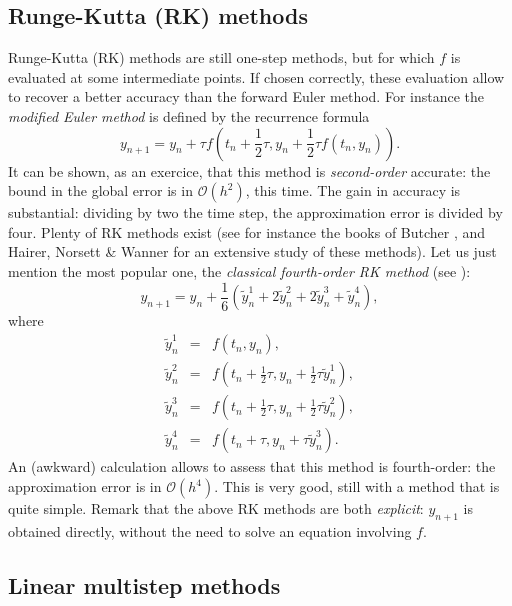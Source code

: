\documentclass{article}
\begin{document}
\subsection{Runge-Kutta (RK) methods}

Runge-Kutta (RK) methods are still one-step methods, but for which $f$ is evaluated at some intermediate points. If chosen correctly, these evaluation allow to recover a better accuracy than the forward Euler method. For instance the \emph{modified Euler method} is defined by the recurrence formula
\[
y_{n+1} = y_n + \tau f \left ( t_n + \frac12 \tau , y_n + \frac12 \tau f ( t_n , y_n ) \right ).
\]
It can be shown, as an exercice, that this method is \emph{second-order} accurate: the bound in the global error is in $\mathcal{O}(h^2)$, this time. The gain in accuracy is substantial: dividing by two the time step, the approximation error is divided by four.
Plenty of RK methods exist (see for instance the books of Butcher \cite{butcher16}, and Hairer, Norsett \& Wanner \cite{hairer93,hairer96} for an extensive study of these methods). Let us just mention the most popular one, the \emph{classical fourth-order RK method} (see \cite{suli03}):
\[
y_{n+1} = y_n + \frac16 \left ( \tilde y^1_n + 2 \tilde y^2_n + 2 \tilde y^3_n + \tilde y^4_n \right ),
\]
where
\begin{eqnarray*}
\tilde y^1_n &=& f(t_n,y_n), \\ 
\tilde y^2_n &=& f(t_n + \frac12 \tau, y_n + \frac12 \tau \tilde y^1_n), \\ 
\tilde y^3_n &=& f(t_n + \frac12 \tau, y_n + \frac12 \tau \tilde y^2_n), \\ 
\tilde y^4_n &=& f(t_n + \tau, y_n + \tau \tilde y^3_n).
\end{eqnarray*}
An (awkward) calculation allows to assess that this method is fourth-order: the approximation error is in $\mathcal{O}(h^4)$. This is very good, still with a method that is quite simple. Remark that the above RK methods are both \emph{explicit}: $y_{n+1}$ is obtained directly, without the need to solve an equation involving $f$. 


\subsection{Linear multistep methods}
\end{document}
